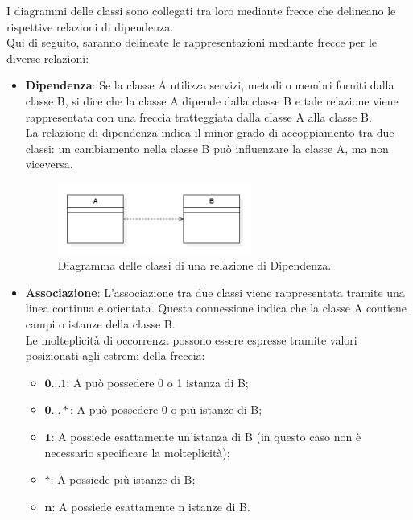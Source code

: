 I diagrammi delle classi sono collegati tra loro mediante frecce che delineano le rispettive relazioni di dipendenza. \\
Qui di seguito, saranno delineate le rappresentazioni mediante frecce per le diverse relazioni: \\
\begin{itemize}
    \item \textbf{Dipendenza}: Se la classe A utilizza servizi, metodi o membri forniti dalla classe B, si dice che la classe A dipende dalla classe B e tale relazione viene rappresentata con una freccia tratteggiata dalla classe A alla classe B. \\
    La relazione di dipendenza indica il minor grado di accoppiamento tra due classi: un cambiamento nella classe B può influenzare la classe A, ma non viceversa.
    \begin{figure}[H]
        \centering
        \includegraphics[width=0.6\textwidth]{../Images/NormeDiProgetto/ClassDiagram_Dipendenza.PNG}
        \caption{Diagramma delle classi di una relazione di Dipendenza.}
    \end{figure}
    \item \textbf{Associazione}: L'associazione tra due classi viene rappresentata tramite una linea continua e orientata. Questa connessione indica che la classe A contiene campi o istanze della classe B. \\
    Le molteplicità di occorrenza possono essere espresse tramite valori posizionati agli estremi della freccia:
    \begin{itemize}
        \item $\mathbf{0...1}$: A può possedere 0 o 1 istanza di B;
        \item $\mathbf{0...*}$: A può possedere 0 o più istanze di B;
        \item $\mathbf{1}$:  A possiede esattamente un'istanza di B (in questo caso non è necessario specificare la molteplicità);
        \item $\mathbf{*}$: A possiede più istanze di B;
        \item $\mathbf{n}$: A possiede esattamente n istanze di B.
    \end{itemize}

\end{itemize}
